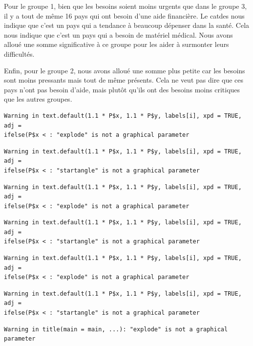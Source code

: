 \documentclass[
]{article}
\begin{document}
Pour le groupe 1, bien que les besoins soient moins urgents que dans le
groupe 3, il y a tout de même 16 pays qui ont besoin d'une aide
financière. Le catdes nous indique que c'est un pays qui a tendance à
beaucoup dépenser dans la santé. Cela nous indique que c'est un pays qui
a besoin de matériel médical. Nous avons alloué une somme significative
à ce groupe pour les aider à surmonter leurs difficultés.

Enfin, pour le groupe 2, nous avons alloué une somme plus petite car les
besoins sont moins pressants mais tout de même présents. Cela ne veut
pas dire que ces pays n'ont pas besoin d'aide, mais plutôt qu'ils ont
des besoins moins critiques que les autres groupes.

\begin{verbatim}
Warning in text.default(1.1 * P$x, 1.1 * P$y, labels[i], xpd = TRUE, adj =
ifelse(P$x < : "explode" is not a graphical parameter
\end{verbatim}

\begin{verbatim}
Warning in text.default(1.1 * P$x, 1.1 * P$y, labels[i], xpd = TRUE, adj =
ifelse(P$x < : "startangle" is not a graphical parameter
\end{verbatim}

\begin{verbatim}
Warning in text.default(1.1 * P$x, 1.1 * P$y, labels[i], xpd = TRUE, adj =
ifelse(P$x < : "explode" is not a graphical parameter
\end{verbatim}

\begin{verbatim}
Warning in text.default(1.1 * P$x, 1.1 * P$y, labels[i], xpd = TRUE, adj =
ifelse(P$x < : "startangle" is not a graphical parameter
\end{verbatim}

\begin{verbatim}
Warning in text.default(1.1 * P$x, 1.1 * P$y, labels[i], xpd = TRUE, adj =
ifelse(P$x < : "explode" is not a graphical parameter
\end{verbatim}

\begin{verbatim}
Warning in text.default(1.1 * P$x, 1.1 * P$y, labels[i], xpd = TRUE, adj =
ifelse(P$x < : "startangle" is not a graphical parameter
\end{verbatim}

\begin{verbatim}
Warning in title(main = main, ...): "explode" is not a graphical parameter
\end{verbatim}
\end{document}
